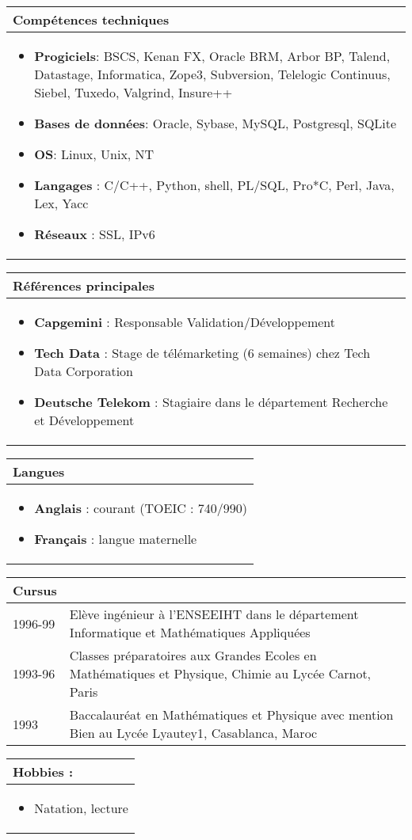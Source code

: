 \documentclass[a4paper,11pt]{report}
\begin{document}
\begin{tabularx}{\textwidth}{X}
\hline
\textbf{Comp\'etences  techniques}\\
\hline
\begin{itemize}
\item     \textbf{Progiciels}: BSCS, Kenan FX, Oracle BRM, Arbor BP, Talend, Datastage, Informatica, Zope3, Subversion, Telelogic Continuus, Siebel, Tuxedo, Valgrind, Insure++
\item     \textbf{Bases de donn\'ees}: Oracle, Sybase, MySQL, Postgresql, SQLite
\item     \textbf{OS}: Linux, Unix, NT
\item     \textbf{Langages} : C/C++, Python, shell, PL/SQL, Pro*C, Perl, Java, Lex, Yacc
\item     \textbf{R\'eseaux} : SSL, IPv6
\end{itemize}
\end{tabularx}

\begin{tabularx}{\textwidth}{X}
\hline
\textbf{R\'ef\'erences principales}\\
\hline
\begin{itemize}
\item \textbf{Capgemini} : Responsable Validation\slash D\'eveloppement
\item \textbf{Tech Data} : Stage de t\'el\'emarketing (6 semaines) chez Tech Data Corporation
\item \textbf{Deutsche Telekom} : Stagiaire dans le d\'epartement Recherche et D\'eveloppement
\end{itemize}
\end{tabularx}

\begin{tabularx}{\textwidth}{X}
\hline
\textbf{Langues}\\
\hline
\begin{itemize}
\item \textbf{Anglais} : courant (TOEIC : 740\slash990)
\item \textbf{Fran\c{c}ais} : langue maternelle
\end{itemize}
\end{tabularx}


\begin{tabularx}{\textwidth}{p{}X}
\hline
\textbf{Cursus} & \\
\hline

1996-99 & El\`eve ing\'enieur \`a l'ENSEEIHT dans le d\'epartement Informatique et Math\'ematiques Appliqu\'ees \\
1993-96 & Classes pr\'eparatoires aux Grandes Ecoles en Math\'ematiques et Physique, Chimie au Lyc\'ee Carnot, Paris \\
1993    &   Baccalaur\'eat en Math\'ematiques et Physique avec mention Bien au Lyc\'ee Lyautey1, Casablanca, Maroc \\
\end{tabularx}


\begin{tabularx}{\textwidth}{X}
\hline
\textbf{Hobbies :}\\
\hline
\begin{itemize}
\item Natation, lecture
\end{itemize}
\end{tabularx}


\end{document}
